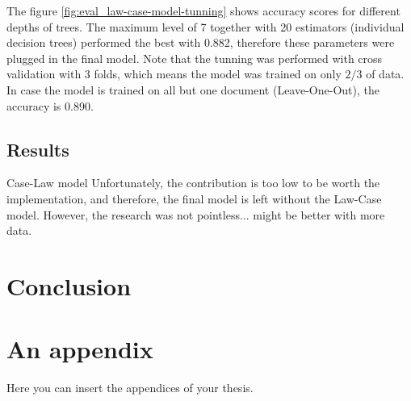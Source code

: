 \documentclass[
  digital, %
  notable,   %
  nolof,     %
  nolot,     %
]{fithesis3}
\begin{document}
The figure \ref{fig:eval_law-case-model-tunning} shows accuracy scores for different depths of trees.
The maximum level of 7 together with 20 estimators (individual decision trees) performed the best with 0.882, therefore these parameters were plugged in the final model.
Note that the tunning was performed with cross validation with 3 folds, which means the model was trained on only $2/3$ of data.
In case the model is trained on all but one document (Leave-One-Out), the accuracy is 0.890.

\section{Results}

Case-Law model
Unfortunately, the contribution is too low to be worth the implementation, and therefore, the final model is left without the Law-Case model. However, the research was not pointless... might be better with more data.



\chapter{Conclusion}






  \printbibliography[heading=bibintoc] %

  \makeatletter\thesis@blocks@clear\makeatother
  \printindex

\appendix %
\chapter{An appendix}
Here you can insert the appendices of your thesis.
\end{document}
